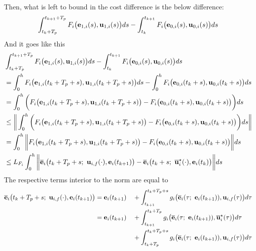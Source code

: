\begin{bw_box}
  Then, what is left to bound in the cost difference is the below difference:
  \begin{align}
    \int_{t_k + T_p}^{t_{k+1} + T_p} F_i\big(\bm{\mathbf{e}}_{1,i}(s), \bm{\mathbf{u}}_{1,i}(s)\big) ds
    -\int_{t_k}^{t_{k+1}} F_i \big(\bm{\mathbf{e}}_{0,i}(s), \bm{\mathbf{u}}_{0,i} (s)\big) d s
  \end{align}
  And it goes like this
  \begin{align}
    &\int_{t_k + T_p}^{t_{k+1} + T_p} F_i\big(\vect{e}_{1,i}(s), \vect{u}_{1,i}(s)\big) ds
      -\int_{t_k}^{t_{k+1}} F_i \big(\vect{e}_{0,i}(s), \vect{u}_{0,i} (s)\big) d s \\
    &= \int_{0}^{h} F_i\big(\vect{e}_{1,i}(t_k + T_p + s), \vect{u}_{1,i}(t_k + T_p + s)\big) ds
      -\int_{0}^{h} F_i \big(\vect{e}_{0,i}(t_k + s), \vect{u}_{0,i} (t_k + s)\big) d s \\
    &= \int_{0}^{h} \bigg( F_i\big(\vect{e}_{1,i}(t_k + T_p + s), \vect{u}_{1,i}(t_k + T_p + s)\big)
      - F_i \big(\vect{e}_{0,i}(t_k + s), \vect{u}_{0,i} (t_k + s)\big) \bigg) d s \\
    &\leq \bigg\| \int_{0}^{h} \bigg( F_i\big(\vect{e}_{1,i}(t_k + T_p + s), \vect{u}_{1,i}(t_k + T_p + s)\big)
      - F_i \big(\vect{e}_{0,i}(t_k + s), \vect{u}_{0,i} (t_k + s)\big) \bigg) d s \bigg \|\\
    &= \int_{0}^{h} \bigg\| F_i\big(\vect{e}_{1,i}(t_k + T_p + s), \vect{u}_{1,i}(t_k + T_p + s)\big)
      - F_i \big(\vect{e}_{0,i}(t_k + s), \vect{u}_{0,i} (t_k + s)\big) \bigg\| d s \\
    &\leq L_{F_i} \int_{0}^{h} \bigg\| \overline{\vect{e}}_i\big(t_k + T_p + s;\ \vect{u}_{i,f}(\cdot), \vect{e}_i(t_{k+1})\big)
      - \overline{\vect{e}}_i\big(t_k + s;\ \overline{\vect{u}}_i^{\star}(\cdot), \vect{e}_i(t_k)\big) \bigg\| d s \\
  \label{eq:delta_F}
  \end{align}
  The respective terms interior to the norm are equal to
  \begin{alignat}{2}
    \overline{\vect{e}}_i\big(t_k + T_p + s;\ \vect{u}_{i,f}(\cdot), \vect{e}_i(t_{k+1})\big)
      & = \vect{e}_i(t_{k+1})
      && + \int_{t_{k+1}}^{t_k + T_p + s} g_i\big(\overline{\vect{e}}_i(\tau;\ \vect{e}_i(t_{k+1})), \vect{u}_{i,f}(\tau)\big) d\tau \\
      & = \vect{e}_i(t_{k+1})
      && + \int_{t_{k+1}}^{t_k + T_p} g_i\big(\overline{\vect{e}}_i(\tau;\ \vect{e}_i(t_{k+1})), \overline{\vect{u}}_i^{\star}(\tau)\big) d\tau \\
      & && + \int_{t_k + T_p}^{t_k + T_p + s} g_i\big(\overline{\vect{e}}_i(\tau;\ \vect{e}_i(t_{k+1})), \vect{u}_{i,f}(\tau)\big) d\tau \\

\end{alignat}
\end{bw_box}
